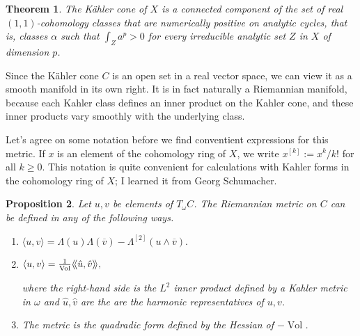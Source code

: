 \documentclass[11pt,a4paper]{amsart}
\newtheorem{theo}{Theorem}[section]
\newtheorem{prop}[theo]{Proposition}
\theoremstyle{definition}
\theoremstyle{remark}
\newcommand{\Vol}{\mathop{\mathrm{Vol}}}
\def\ov#1{\overline{#1}}
\def\kf{\omega}
\def\Lef{\Lambda}
\def\ton{u}
\def\ttw{v}
\def\^#1{^{[#1]}}
\def\KC{C}
\begin{document}
\begin{theo}
The K\"{a}hler cone of $X$ is a connected component of the set of real
$(1,1)$-cohomology classes that are numerically positive on analytic
cycles, that is, classes $\alpha$ such that $\int_{Z} a^p > 0$ for every
irreducible analytic set $Z$ in $X$ of dimension $p$.
\end{theo}



Since the K\"{a}hler cone $\KC$ is an open set in a real vector space,
we can view it as a smooth manifold in its own right. It is in fact
naturally a Riemannian manifold, because each Kahler class defines an
inner product on the Kahler cone, and these inner products vary smoothly
with the underlying class.


Let's agree on some notation before we find conventient expressions for
this metric. If $x$ is an element of the cohomology ring of $X$, we
write $x\^k := x^k/k!$ for all $k \geq 0$. This notation is
quite convenient for calculations with Kahler forms in the cohomology
ring of $X$; I learned it from Georg Schumacher.


\begin{prop}
Let $\ton,\ttw$ be elements of $T_{\kf}C$. The Riemannian metric on $C$
can be defined in any of the following ways.
\begin{enumerate}
    \item
\hfil
$
\langle \ton, \ttw \rangle
= \Lef(\ton)\Lef(\ov\ttw)
- \Lef\^2(\ton\wedge\ov\ttw).
$
\hfil
    \item 
$
\hfil
\langle\ton, \ttw \rangle
= 
\frac{1}{\Vol} \langle\!\langle \hat\ton, \hat\ttw \rangle\!\rangle,
\hfil
$

\noindent
where the right-hand side is the $L^2$ inner product defined by a Kahler
metric in $\kf$ and $\hat\ton,\hat\ttw$ are the are the harmonic
representatives of $\ton, \ttw$.

    \item
The metric is the quadradic form defined by the Hessian of $-\Vol$.
\end{enumerate}
\end{prop}
\end{document}

